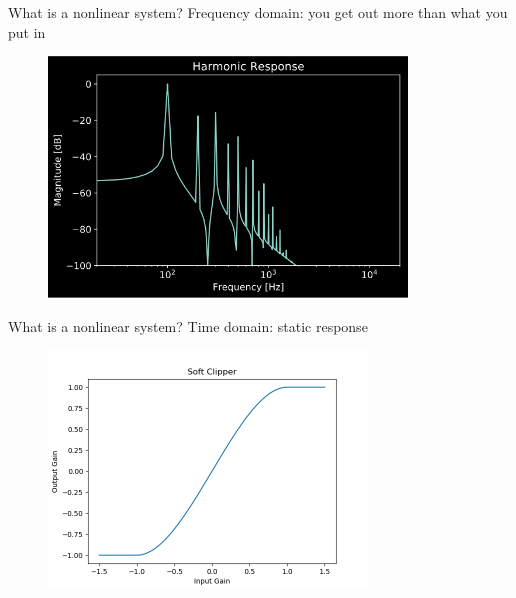 \begin{frame}
\end{frame}

\begin{frame}{What is a nonlinear system?}
    Frequency domain: you get out more than what you put in
    \begin{figure}
        \includegraphics[width=3.75in]{../Exciter/Pics/exciter_harm.png}
    \end{figure}
\end{frame}

\begin{frame}{What is a nonlinear system?}
    Time domain: static response
    \begin{figure}
        \includegraphics[height=2.5in]{../DoubleSoftClipper/Pics/SC.png}
    \end{figure}
\end{frame}

